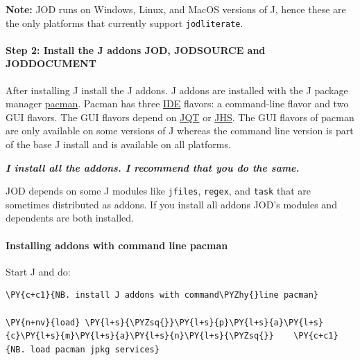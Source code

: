 \textbf{Note:} JOD runs on Windows, Linux, and MacOS versions of J,
hence these are the only platforms that currently support
\texttt{jodliterate}.

    \hypertarget{step-2-install-the-j-addons-jod-jodsource-and-joddocument}{%
\paragraph{Step 2: Install the J addons JOD, JODSOURCE and
JODDOCUMENT}\label{step-2-install-the-j-addons-jod-jodsource-and-joddocument}}

After installing J install the J addons. J addons are installed with the
J package manager \href{https://code.jsoftware.com/wiki/Pacman}{pacman}.
Pacman has three
\href{https://en.wikipedia.org/wiki/Integrated_development_environment}{IDE}
flavors: a command-line flavor and two GUI flavors. The GUI flavors
depend on \href{https://code.jsoftware.com/wiki/Guides/Qt_IDE}{JQT} or
\href{https://code.jsoftware.com/wiki/Guides/JHS/Server}{JHS}. The GUI
flavors of pacman are only available on some versions of J whereas the
command line version is part of the base J install and is available on
all platforms.

\textbf{\emph{I install all the addons. I recommend that you do the
same.}}

JOD depends on some J modules like \texttt{jfiles}, \texttt{regex}, and
\texttt{task} that are sometimes distributed as addons. If you install
all addons JOD's modules and dependents are both installed.

    \hypertarget{installing-addons-with-command-line-pacman}{%
\paragraph{Installing addons with command line
pacman}\label{installing-addons-with-command-line-pacman}}

Start J and do:

    \begin{tcolorbox}[breakable, size=fbox, boxrule=1pt, pad at break*=1mm,colback=cellbackground, colframe=cellborder]
\begin{Verbatim}[commandchars=\\\{\}]
\PY{c+c1}{NB. install J addons with command\PYZhy{}line pacman}

\PY{n+nv}{load} \PY{l+s}{\PYZsq{}}\PY{l+s}{p}\PY{l+s}{a}\PY{l+s}{c}\PY{l+s}{m}\PY{l+s}{a}\PY{l+s}{n}\PY{l+s}{\PYZsq{}}    \PY{c+c1}{NB. load pacman jpkg services}
\end{Verbatim}
\end{tcolorbox}

